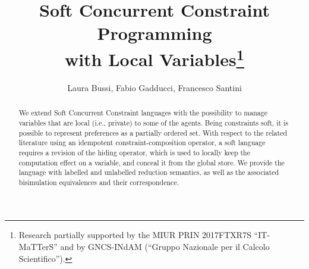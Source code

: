 \documentclass{llncs}
\begin{document}
\title{Soft Concurrent Constraint Programming\\ with Local Variables\thanks{Research partially supported by the MIUR PRIN 2017FTXR7S ``IT-MaTTerS''
and by GNCS-INdAM (``Gruppo Nazionale per il Calcolo Scientifico'').}
}


\author{Laura Bussi, Fabio Gadducci, 
Francesco Santini
} 
	

\maketitle

\begin{abstract}
We extend Soft Concurrent Constraint languages with the possibility to manage variables that are local (i.e., private) to some of the agents. Being  constraints soft,  it is possible to represent preferences as a partially ordered set.
With respect to the related literature using an idempotent constraint-composition operator, a soft language requires a revision of the hiding operator, which is used to locally keep the computation effect on a variable, and conceal it from the  global store.
We provide the language with labelled and unlabelled reduction semantics, as well as the associated bisimulation equivalences and  their correspondence.
\end{abstract}


\end{document}
